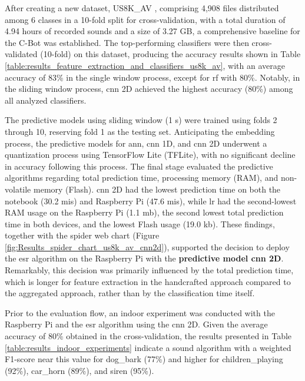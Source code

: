 After creating a new dataset, US8K\_AV \cite{florentino2024}, comprising 4,908 files distributed among 6 classes in a 10-fold split for cross-validation, with a total duration of 4.94 hours of recorded sounds and a size of 3.27 GB, a comprehensive baseline for the C-Bot was established. The top-performing classifiers were then cross-validated (10-fold) on this dataset, producing the accuracy results shown in Table \ref{table:results_feature_extraction_and_classifiers_us8k_av}, with an average accuracy of 83\% in the single window process, except for \gls{rf} with 80\%. Notably, in the sliding window process, \gls{cnn} 2D achieved the highest accuracy (80\%) among all analyzed classifiers.

The predictive models using sliding window (1 \gls{s}) were trained using folds 2 through 10, reserving fold 1 as the testing set. Anticipating the embedding process, the predictive models for \gls{ann}, \gls{cnn} 1D, and \gls{cnn} 2D underwent a quantization process using TensorFlow Lite (TFLite), with no significant decline in accuracy following this process. The final stage evaluated the predictive algorithms regarding total prediction time, processing memory (RAM), and non-volatile memory (Flash). \gls{cnn} 2D had the lowest prediction time on both the notebook (30.2 \gls{mi}\gls{s}) and Raspberry Pi (47.6 \gls{mi}\gls{s}), while \gls{lr} had the second-lowest RAM usage on the Raspberry Pi (1.1 \gls{m}\gls{b}), the second lowest total prediction time in both devices, and the lowest Flash usage (19.0 \gls{k}\gls{b}). These findings, together with the spider web chart (Figure \ref{fig:Results_spider_chart_us8k_av_cnn2d}), supported the decision to deploy the \gls{esr} algorithm on the Raspberry Pi with the \textbf{predictive model \gls{cnn} 2D}. Remarkably, this decision was primarily influenced by the total prediction time, which is longer for feature extraction in the handcrafted approach compared to the aggregated approach, rather than by the classification time itself.

Prior to the evaluation flow, an indoor experiment was conducted with the Raspberry Pi and the \gls{esr} algorithm using the \gls{cnn} 2D. Given the average accuracy of 80\% obtained in the cross-validation, the results presented in Table \ref{table:results_indoor_experiments} indicate a sound algorithm with a weighted F1-score near this value for dog\_bark (77\%) and higher for children\_playing (92\%), car\_horn (89\%), and siren (95\%).



